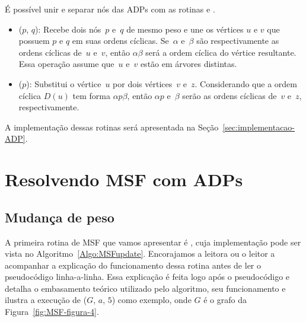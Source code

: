 É possível unir e separar nós das ADPs com as rotinas \LCOMerge{} e \LCOSplit{}.

\begin{itemize}
\item \LCOMerge($p$, $q$): Recebe dois nós~$p$ e~$q$ de mesmo peso e une os vértices $u$ e $v$ que possuem $p$ e $q$ em suas ordens cíclicas.
Se~$\alpha$ e~$\beta$ são respectivamente as ordens cíclicas de~$u$ e~$v$, então $\alpha\beta$ será a ordem cíclica do vértice resultante. 
Essa operação assume que~$u$ e~$v$ estão em árvores distintas.
\item \LCOSplit($p$): Substitui o vértice~$u$ por dois vértices~$v$ e~$z$.
Considerando que a ordem cíclica $D(u)$ tem forma $\alpha p\beta$, então $\alpha p$ e~$\beta$ serão as ordens cíclicas de~$v$ e~$z$, respectivamente.
\end{itemize}


A implementação dessas rotinas será apresentada na Seção~\ref{sec:implementacao-ADP}.


\section{Resolvendo MSF com ADPs}

\subsection{Mudança de peso}
A primeira rotina de MSF que vamos apresentar é \MSFupdate{}, cuja implementação pode ser vista no Algoritmo~\ref{Algo:MSFupdate}.
Encorajamos a leitora ou o leitor a acompanhar a explicação do funcionamento dessa rotina antes de ler o pseudocódigo linha-a-linha.
Essa explicação é feita logo após o pseudocódigo e detalha o embasamento teórico utilizado pelo algoritmo, seu funcionamento e ilustra a execução de \MSFupdate($G$, $a$, $5$) como exemplo, onde $G$ é o grafo da Figura~\ref{fig:MSF-figura-4}.



